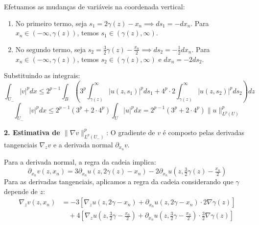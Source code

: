 \documentclass[cs_edp_2026.1.tex]{subfiles} %
\begin{document}
{	Efetuamos as mudanças de variáveis na coordenada vertical:
	\begin{enumerate}[label=(\roman*)]
		\item No primeiro termo, seja $s_1 = 2\gamma(z) - x_n \implies ds_1 = -dx_n$. Para $x_n \in (-\infty, \gamma(z))$, temos $s_1 \in (\gamma(z), \infty)$.
		\item No segundo termo, seja $s_2 = \tfrac{3}{2}\gamma(z) - \tfrac{x_n}{2} \implies ds_2 = -\tfrac{1}{2} dx_n$. Para $x_n \in (-\infty, \gamma(z))$, temos $s_2 \in (\gamma(z), \infty)$ e $dx_n = -2 ds_2$.
	\end{enumerate}
	Substituindo as integrais:
	$$\int_{U_-} |v|^p dx \le 2^{p-1} \int_B \left( 3^p \int_{\gamma(z)}^{\infty} |u(z, s_1)|^p ds_1 + 4^p \cdot 2 \int_{\gamma(z)}^{\infty} |u(z, s_2)|^p ds_2 \right) dz$$
	$$\int_{U_-} |v|^p dx \le 2^{p-1}(3^p + 2 \cdot 4^p) \int_U |u|^p dx = 2^{p-1}(3^p + 2 \cdot 4^p) \|u\|_{L^p(U)}^p$$
	
	\textbf{2. Estimativa de $\|\nabla v\|_{L^p(U_-)}^p$}:
	O gradiente de $v$ é composto pelas derivadas tangenciais $\nabla_z v$ e a derivada normal $\partial_{x_n} v$. 
	
	Para a derivada normal, a regra da cadeia implica:
	$$\partial_{x_n} v(z, x_n) = 3 \partial_{x_n} u(z, 2\gamma(z) - x_n) - 2 \partial_{x_n} u(z, \tfrac{3}{2}\gamma(z) - \tfrac{x_n}{2})$$
	Para as derivadas tangenciais, aplicamos a regra da cadeia considerando que $\gamma$ depende de $z$:
	\begin{align*}
		\nabla_z v(z, x_n) &= -3 \left[ \nabla_z u(z, 2\gamma - x_n) + \partial_{x_n} u(z, 2\gamma - x_n) \cdot 2\nabla \gamma(z) \right] \\
		&\quad + 4 \left[ \nabla_z u(z, \tfrac{3}{2}\gamma - \tfrac{x_n}{2}) + \partial_{x_n} u(z, \tfrac{3}{2}\gamma - \tfrac{x_n}{2}) \cdot \tfrac{3}{2}\nabla \gamma(z) \right]
	\end{align*}
	
}
\end{document}
